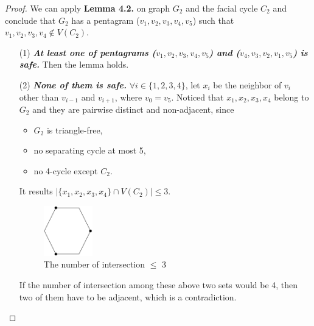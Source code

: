 \begin{proof}
We can apply \textbf{Lemma 4.2.} on graph $G_2$ and the facial cycle $C_2$ and conclude that $G_2$ has a pentagram ($v_1, v_2, v_3, v_4, v_5$) such that $v_1, v_2, v_3, v_4 \notin V(C_2)$.
\begin{itemize}
    \item[(1)] \textit{\textbf{At least one of pentagrams ($v_1, v_2, v_3, v_4, v_5$) and ($v_4, v_3, v_2, v_1, v_5$) is safe.}} Then the lemma holds.
    \item[(2)] \textit{\textbf{None of them is safe.}} $\forall i \in \{1, 2, 3, 4\}$, let $x_i$ be the neighbor of $v_i$ other than $v_{i-1}$ and $v_{i+1}$, where $v_0 = v_5$. Noticed that $x_1, x_2, x_3, x_4$ belong to $G_2$ and they are pairwise distinct and non-adjacent, since 
    \begin{itemize}
        \item $G_2$ is triangle-free,
        \item no separating cycle at most 5,
        \item no 4-cycle except $C_2$.
    \end{itemize}
    It results $|\{x_1, x_2, x_3, x_4\} \cap V(C_2)| \leq 3$.
    \begin{figure}[H] %
    \centering %
    \includegraphics[width=0.2\textwidth]{figure/intersect3vertices.png} 
    \caption{The number of intersection $\leq$ 3} %
    \label{figure} %
    \end{figure}
    If the number of intersection among these above two sets would be 4, then two of them have to be adjacent, which is a contradiction.


\end{itemize}
\end{proof}
